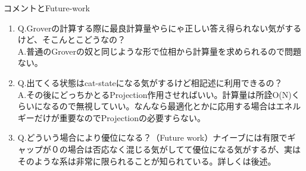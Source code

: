 \documentclass[a4paper,10.5pt]{article}
\numberwithin{equation}{section}
\begin{document}
\begin{enumerate}
コメントとFuture-work
\begin{enumerate}
    \item Q.Groverの計算する際に最良計算量やらにゃ正しい答え得られない気がするけど、そこんとこどうなの？\\
    A.普通のGroverの奴と同じような形で位相から計算量を求められるので問題ない。
    \item Q.出てくる状態はcat-stateになる気がするけど相記述に利用できるの？\\
    A.その後にどっちかとるProjection作用させればいい。計算量は所詮O(N)くらいになるので無視していい。なんなら最適化とかに応用する場合はエネルギーだけが重要なのでProjectionの必要すらない。
    \item Q.どういう場合により優位になる？（Future work）ナイーブには有限でギャップが０の場合は否応なく混じる気がしてて優位になる気がするが、実はそのような系は非常に限られることが知られている。詳しくは後述。
\end{enumerate}

\end{enumerate}
\end{document}
